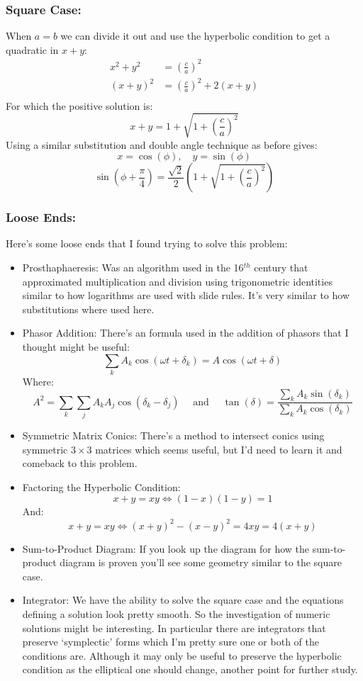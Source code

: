 \subsubsection{Square Case:}
When $a=b$ we can divide it out and use the hyperbolic condition to get a quadratic in $x+y$:
\[\begin{aligned}
	x^2+y^2&=\left(\frac{c}{a}\right)^2\\
	(x+y)^2&=\left(\frac{c}{a}\right)^2+2(x+y)\\
\end{aligned}\]
For which the positive solution is:
\[x+y = 1+\sqrt{1+\left(\frac{c}{a}\right)^2}\]
Using a similar substitution and double angle technique as before gives:
\[x=\cos(\phi),\quad y=\sin(\phi)\]
\[\sin\left(\phi+\frac{\pi}{4}\right)=\frac{\sqrt{2}}{2}\left(1+\sqrt{1+\left(\frac{c}{a}\right)^2}\right)\]

\subsubsection{Loose Ends:}
Here's some loose ends that I found trying to solve this problem:
\begin{itemize}
	\item Prosthaphaeresis: Was an algorithm used in the 16$^{th}$ century that approximated multiplication and division using trigonometric identities similar to how logarithms are used with slide rules. 
	It's very similar to how substitutions where used here.
	\item Phasor Addition: There's an formula used in the addition of phasors that I thought might be useful:
	\[\sum_kA_k\cos(\omega t+\delta_k) = A\cos(\omega t+\delta)\]
	Where:
	\[A^2 = \sum_k\sum_jA_kA_j\cos(\delta_k-\delta_j)\quad\text{ and }\quad\tan(\delta) = \frac{\sum_k A_k\sin(\delta_k)}{\sum_k A_k\cos(\delta_k)}\]
	\item Symmetric Matrix Conics: There's a method to intersect conics using symmetric $3\times3$ matrices which seems useful, but I'd need to learn it and comeback to this problem.
	\item Factoring the Hyperbolic Condition: 
	\[x+y=xy\Leftrightarrow (1-x)(1-y)=1\]
	And:
	\[x+y=xy\Leftrightarrow(x+y)^2-(x-y)^2=4xy=4(x+y)\]
	\item Sum-to-Product Diagram: If you look up the diagram for how the sum-to-product diagram is proven you'll see some geometry similar to the square case.
	\item Integrator: We have the ability to solve the square case and the equations defining a solution look pretty smooth.
	So the investigation of numeric solutions might be interesting.
	In particular there are integrators that preserve `symplectic' forms which I'm pretty sure one or both of the conditions are.
	Although it may only be useful to preserve the hyperbolic condition as the elliptical one should change,
	another point for further study.
\end{itemize}
